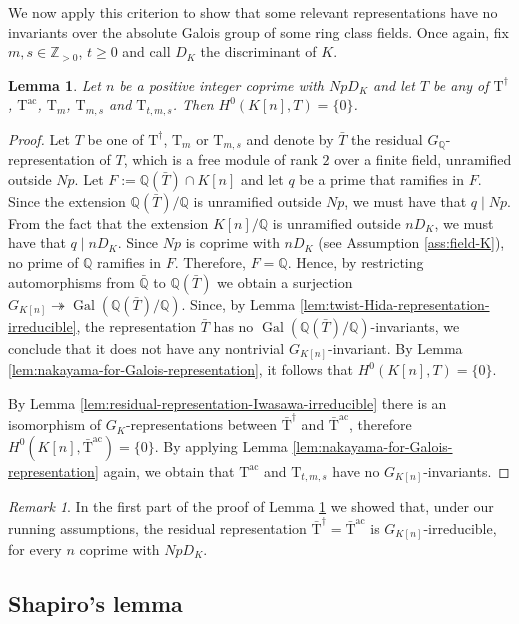 \documentclass[12pt,reqno]{amsart}
\newtheorem{lemma}[theorem]{Lemma}
\theoremstyle{definition}
\theoremstyle{remark}
\newtheorem{remark}[theorem]{Remark}
\newcommand{\numberset}{\mathbb}
\newcommand{\Q}{\numberset{Q}}
\newcommand{\Z}{\numberset{Z}}
\newcommand{\T}{\boldsymbol{\mathrm{T}}}
\DeclareMathOperator{\Gal}{Gal}
\newcommand{\ac}{\mathrm{ac}}
\begin{document}
We now apply this criterion to show that some relevant representations have no invariants over the absolute Galois group of some ring class fields. Once again, fix $m,s\in\Z_{>0}$, $t\ge 0$ and call $D_K$ the discriminant of $K$.

\begin{lemma}\label{lem:no-invariants}
    Let $n$ be a positive integer coprime with $NpD_K$ and let $T$ be any of $\T^{\dag}$, $\T^{\ac}$, $\T_m$, $\T_{m,s}$ and $\T_{t,m,s}$. Then $H^0(K[n],T)=\{0\}$.
\end{lemma}
\begin{proof}
    Let $T$ be one of $\T^{\dag}$,  $\T_m$ or $\T_{m,s}$ and denote by $\bar{T}$ the residual $G_\Q$-representation of $T$, which is a free module of rank $2$ over a finite field, unramified outside $Np$. Let $F:=\Q(\bar{T})\cap K[n]$ and let $q$ be a prime that ramifies in $F$. Since the extension $\Q(\bar{T})/\Q$ is unramified outside $Np$, we must have that $q\mid Np$. From the fact that the extension $K[n]/\Q$ is unramified outside $nD_K$, we must have that $q\mid nD_K$. Since $Np$ is coprime with $n D_K$ (see Assumption \ref{ass:field-K}), no prime of $\Q$ ramifies in $F$. Therefore, $F=\Q$. Hence, by restricting automorphisms from $\bar{\Q}$ to $\Q(\bar{T})$ we obtain a surjection $G_{K[n]}\twoheadrightarrow\Gal(\Q(\bar{T})/\Q)$. Since, by Lemma \ref{lem:twist-Hida-representation-irreducible}, the representation $\bar{T}$ has no $\Gal(\Q(\bar{T})/\Q)$-invariants, we conclude that it does not have any nontrivial $G_{K[n]}$-invariant. By Lemma \ref{lem:nakayama-for-Galois-representation}, it follows that $H^0(K[n],T)=\{0\}$.

    By Lemma \ref{lem:residual-representation-Iwasawa-irreducible} there is an isomorphism of $G_K$-representations between $\bar{\T}^{\dag}$ and $\bar{\T}^{\ac}$, therefore $H^0(K[n],\bar{\T}^{\ac})=\{0\}$. By applying Lemma \ref{lem:nakayama-for-Galois-representation} again, we obtain that $\T^{\ac}$ and $\T_{t,m,s}$ have no $G_{K[n]}$-invariants.
\end{proof}

\begin{remark}\label{rk:irreducibility-over-ring-class-fields}
    In the first part of the proof of Lemma \ref{lem:no-invariants} we showed that, under our running assumptions, the residual representation $\bar{\T}^\dag=\bar{\T}^\ac$ is $G_{K[n]}$-irreducible, for every $n$ coprime with $NpD_K$.
\end{remark}


\subsection{Shapiro's lemma}\label{sec:shapiro-lemma}
\end{document}
